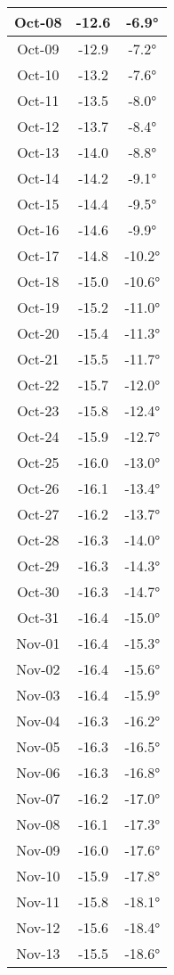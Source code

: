 \begin{footnotesize}
\begin{minipage}{0.33\textwidth}
\begin{tabular}[t]{c | c | c}
Oct-08 & -12.6 & -6.9°\\\hline
Oct-09 & -12.9 & -7.2°\\\hline
Oct-10 & -13.2 & -7.6°\\\hline
Oct-11 & -13.5 & -8.0°\\\hline
Oct-12 & -13.7 & -8.4°\\\hline
Oct-13 & -14.0 & -8.8°\\\hline
Oct-14 & -14.2 & -9.1°\\\hline
Oct-15 & -14.4 & -9.5°\\\hline
Oct-16 & -14.6 & -9.9°\\\hline
Oct-17 & -14.8 & -10.2°\\\hline
Oct-18 & -15.0 & -10.6°\\\hline
Oct-19 & -15.2 & -11.0°\\\hline
Oct-20 & -15.4 & -11.3°\\\hline
Oct-21 & -15.5 & -11.7°\\\hline
Oct-22 & -15.7 & -12.0°\\\hline
Oct-23 & -15.8 & -12.4°\\\hline
Oct-24 & -15.9 & -12.7°\\\hline
Oct-25 & -16.0 & -13.0°\\\hline
Oct-26 & -16.1 & -13.4°\\\hline
Oct-27 & -16.2 & -13.7°\\\hline
Oct-28 & -16.3 & -14.0°\\\hline
Oct-29 & -16.3 & -14.3°\\\hline
Oct-30 & -16.3 & -14.7°\\\hline
Oct-31 & -16.4 & -15.0°\\\hline
Nov-01 & -16.4 & -15.3°\\\hline
Nov-02 & -16.4 & -15.6°\\\hline
Nov-03 & -16.4 & -15.9°\\\hline
Nov-04 & -16.3 & -16.2°\\\hline
Nov-05 & -16.3 & -16.5°\\\hline
Nov-06 & -16.3 & -16.8°\\\hline
Nov-07 & -16.2 & -17.0°\\\hline
Nov-08 & -16.1 & -17.3°\\\hline
Nov-09 & -16.0 & -17.6°\\\hline
Nov-10 & -15.9 & -17.8°\\\hline
Nov-11 & -15.8 & -18.1°\\\hline
Nov-12 & -15.6 & -18.4°\\\hline
Nov-13 & -15.5 & -18.6°\\\hline

\end{tabular}
\end{minipage}
\end{footnotesize}
